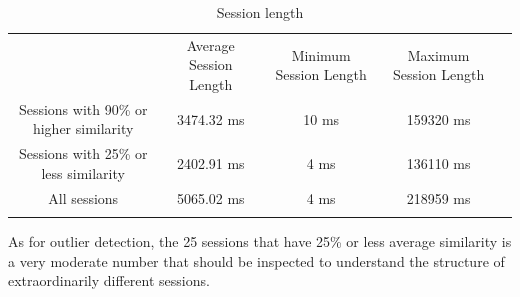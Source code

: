 \begin{table}[h!]
\centering
\caption{Session length}
\label{tab:sessionlength}
\begin{tabular}{ccccl}
\cline{1-4}
\multicolumn{1}{|c|}{}                                        & \multicolumn{1}{c|}{Average Session Length} & \multicolumn{1}{c|}{Minimum Session Length} & \multicolumn{1}{c|}{Maximum Session Length} &  \\ \cline{1-4}
\multicolumn{1}{|c|}{Sessions with 90\% or higher similarity} & \multicolumn{1}{c|}{3474.32 ms}                      & \multicolumn{1}{c|}{10 ms}                      & \multicolumn{1}{c|}{159320 ms}                      &  \\ \cline{1-4}
\multicolumn{1}{|c|}{Sessions with 25\% or less similarity} & \multicolumn{1}{c|}{2402.91 ms}                      & \multicolumn{1}{c|}{4 ms}                      & \multicolumn{1}{c|}{136110 ms}                      &  \\ \cline{1-4}
\multicolumn{1}{|c|}{All sessions}                            & \multicolumn{1}{c|}{5065.02 ms}                      & \multicolumn{1}{c|}{4 ms}                      & \multicolumn{1}{c|}{218959 ms}                      &  \\ \cline{1-4}
\multicolumn{1}{l}{}                                          & \multicolumn{1}{l}{}                        & \multicolumn{1}{l}{}                        & \multicolumn{1}{l}{}                        & 
\end{tabular}
\end{table}

As for outlier detection, the 25 sessions that have 25\% or less average similarity is a very moderate number that should be inspected to understand the structure of extraordinarily different sessions.





